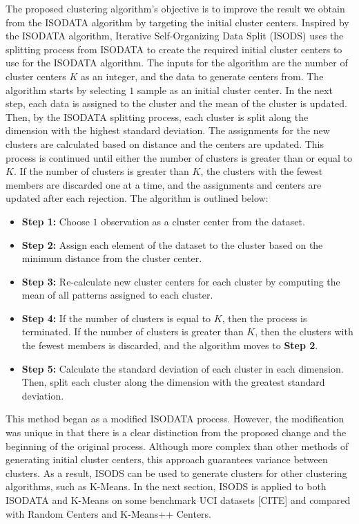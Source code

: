 \documentclass[twoside,twocolumn]{article}
\begin{document}
The proposed clustering algorithm's objective is to improve the result we obtain
from the ISODATA algorithm by targeting the initial cluster centers. Inspired by
the ISODATA algorithm, Iterative Self-Organizing Data Split (ISODS) uses the
splitting process from ISODATA to create the required initial cluster centers to
use for the ISODATA algorithm. The inputs for the algorithm are the number of
cluster centers $K$ as an integer, and the data to generate centers from. The
algorithm starts by selecting $1$ sample as an initial cluster center. In the
next step, each data is assigned to the cluster and the mean of the cluster is
updated. Then, by the ISODATA splitting process, each cluster is split along the
dimension with the highest standard deviation. The assignments for the new
clusters are calculated based on distance and the centers are updated. This
process is continued until either the number of clusters is greater than or
equal to $K$. If the number of clusters is greater than $K$, the clusters with
the fewest members are discarded one at a time, and the assignments and centers
are updated after each rejection. The algorithm is outlined below:

\begin{itemize}
\item \textbf{Step 1:} Choose $1$ observation as a cluster center from the dataset.
\item \textbf{Step 2:} Assign each element of the dataset to the cluster based
on the minimum distance from the cluster center.
\item \textbf{Step 3:} Re-calculate new cluster centers for each cluster by
computing the mean of all patterns assigned to each cluster.
\item \textbf{Step 4:} If the number of clusters is equal to $K$, then the
process is terminated. If the number of clusters is greater than $K$, then the
clusters with the fewest members is discarded, and the algorithm moves to
\textbf{Step 2}.
\item \textbf{Step 5:} Calculate the standard deviation of each cluster in each
dimension. Then, split each cluster along the dimension with the greatest
standard deviation.
\end{itemize}

This method began as a modified ISODATA process. However, the modification was
unique in that there is a clear distinction from the proposed change and the
beginning of the original process. Although more complex than other methods of
generating initial cluster centers, this approach guarantees variance between
clusters. As a result, ISODS can be used to generate clusters for other
clustering algorithms, such as K-Means. In the next section, ISODS is applied to
both ISODATA and K-Means on some benchmark UCI datasets [CITE] and compared with
Random Centers and K-Means++ Centers.
\end{document}
